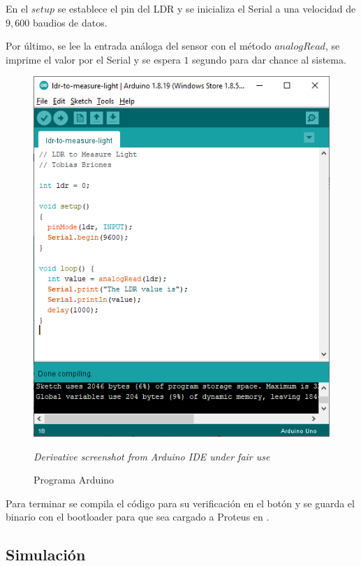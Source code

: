 \documentclass{article}
\begin{document}
En el $setup$ se establece el pin del LDR y se inicializa el Serial a una
velocidad de $9,600$ baudios de datos.

\bigbreak

Por último, se lee la entrada análoga del sensor con el método $analogRead$,
se imprime el valor por el Serial y se espera $1$ segundo para dar chance al
sistema.

\begin{figure}[H]
\centering
\includegraphics[width=0.3\paperwidth]{images/arduino-sketch}
\caption{Programa Arduino}\footnotesize
\textit{Derivative screenshot from Arduino IDE under fair use}
\end{figure}

Para terminar se compila el código para su verificación en el botón
 y se guarda el binario con el bootloader para que sea cargado
a Proteus en .

\subsection{Simulación}
\end{document}
